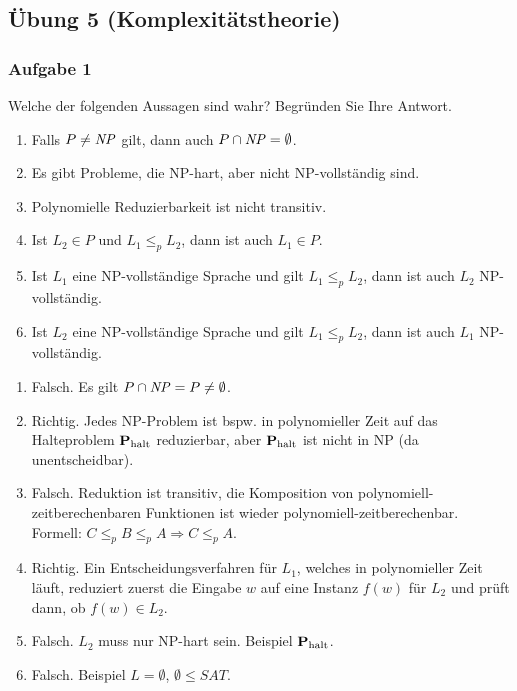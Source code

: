 \subsection*{Übung 5 (Komplexitätstheorie)}
\subsubsection*{Aufgabe 1}
    Welche der folgenden Aussagen sind wahr? Begründen Sie Ihre Antwort.
    \begin{enumerate}
        \item Falls $P \neq \mathit{NP}$ gilt, dann auch $P \cap \mathit{NP} = \emptyset$.{}
        \item Es gibt Probleme, die NP-hart, aber nicht NP-vollständig sind.
        \item Polynomielle Reduzierbarkeit ist nicht transitiv.
        \item Ist $L_{2} \in P$ und $L_{1} \leq_{p} L_{2}$, dann ist auch $L_{1} \in P$.
        \item Ist $L_{1}$ eine NP-vollständige Sprache und gilt $L_{1} \leq_{p} L_{2}$, dann ist auch $L_{2}$ NP-vollständig.
        \item Ist $L_{2}$ eine NP-vollständige Sprache und gilt $L_{1} \leq_{p} L_{2}$, dann ist auch $L_{1}$ NP-vollständig.
    \end{enumerate}

    \LOES
    \begin{enumerate}
        \item Falsch. Es gilt $P \cap \mathit{NP} = P \neq \emptyset$.
        \item Richtig. Jedes NP-Problem ist bspw. in polynomieller Zeit auf das Halteproblem $\textbf{P}_{\text{halt}}$ reduzierbar, aber $\textbf{P}_{\text{halt}}$ ist nicht in NP (da unentscheidbar).
        \item Falsch. Reduktion ist transitiv, die Komposition von polynomiell-zeitberechenbaren Funktionen ist wieder polynomiell-zeitberechenbar. Formell: $C \leq_{p} B \leq_{p} A \Rightarrow C \leq_{p} A$.
        \item Richtig. Ein Entscheidungsverfahren für $L_{1}$, welches in polynomieller Zeit läuft, reduziert zuerst die Eingabe $w$ auf eine Instanz $f(w)$ für $L_{2}$ und prüft dann, ob $f(w) \in L_{2}$.
        \item Falsch. $L_{2}$ muss nur NP-hart sein. Beispiel $\textbf{P}_{\text{halt}}$.
        \item Falsch. Beispiel $L = \emptyset$, $\emptyset \leq SAT$.
    \end{enumerate}


